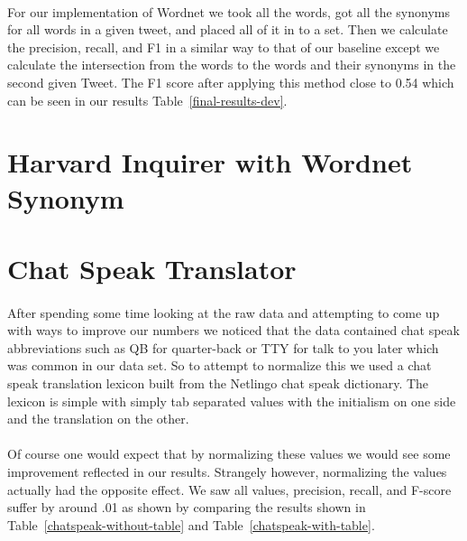 \documentclass[11pt,letterpaper]{article}
\begin{document}
\paragraph{}
For our implementation of Wordnet we took all the words, got all the synonyms for all words in a given tweet, and placed all of it in to a set. Then we calculate the precision, recall, and F1 in a similar way to that of our baseline except we calculate the intersection from the words to the words and their synonyms in the second given Tweet. The F1 score after applying this method close to 0.54 which can be seen in our results Table~\ref{final-results-dev}.



\section{Harvard Inquirer with Wordnet Synonym}

\section{Chat Speak Translator}
\paragraph{}
After spending some time looking at the raw data and attempting to come up with ways to improve our numbers we noticed that the data contained chat speak abbreviations such as QB for quarter-back or TTY for talk to you later which was common in our data set. So to attempt to normalize this we used a chat speak translation lexicon built from the Netlingo chat speak dictionary. The lexicon is simple with simply tab separated values with the initialism on one side and the translation on the other.
\paragraph{}
Of course one would expect that by normalizing these values we would see some improvement reflected in our results. Strangely however, normalizing the values actually had the opposite effect. We saw all values, precision, recall, and F-score suffer by around .01 as shown by comparing the results shown in Table~\ref{chatspeak-without-table} and Table~\ref{chatspeak-with-table}.
\end{document}
